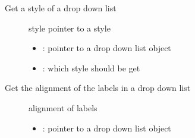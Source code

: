 \documentclass[letterpaper,10pt,english]{sphinxmanual}
\begin{document}

\begin{fulllineitems}
\label{\detokenize{object-types/ddlist:_CPPv419lv_ddlist_get_stylePK8lv_obj_t17lv_ddlist_style_t}}%
\pysigstartmultiline
{}\label{\detokenize{object-types/ddlist:lv__ddlist_8h_1a70adf58a58cf9e5fdf9c2b2bf95323d8}}%
\pysigstopmultiline
Get a style of a drop down list \begin{description}
\item[{}] \leavevmode
style pointer to a style 

\item[{}] \leavevmode\begin{itemize}
\item {} 
: pointer to a drop down list object 

\item {} 
: which style should be get 

\end{itemize}

\end{description}


\end{fulllineitems}


\begin{fulllineitems}
\label{\detokenize{object-types/ddlist:_CPPv419lv_ddlist_get_alignPK8lv_obj_t}}%
\pysigstartmultiline
{}\label{\detokenize{object-types/ddlist:lv__ddlist_8h_1a4a09ffd7a9f177b8c4b076def102e344}}%
\pysigstopmultiline
Get the alignment of the labels in a drop down list \begin{description}
\item[{}] \leavevmode
alignment of labels 

\item[{}] \leavevmode\begin{itemize}
\item {} 
: pointer to a drop down list object 

\end{itemize}

\end{description}


\end{fulllineitems}
\end{document}
